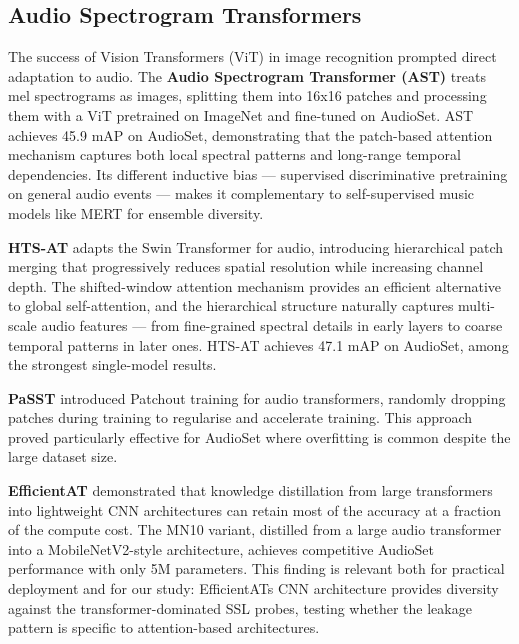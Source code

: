 \documentclass[conference]{IEEEtran}
\begin{document}
\subsection{Audio Spectrogram
Transformers}\label{e.-audio-spectrogram-transformers}

The success of Vision Transformers (ViT) \citep{dosovitskiy2021vit} in
image recognition prompted direct adaptation to audio. The \textbf{Audio
Spectrogram Transformer (AST)} \citep{gong2021ast} treats mel
spectrograms as images, splitting them into 16x16 patches and processing
them with a ViT pretrained on ImageNet and fine-tuned on AudioSet. AST
achieves 45.9 mAP on AudioSet, demonstrating that the patch-based
attention mechanism captures both local spectral patterns and long-range
temporal dependencies. Its different inductive bias --- supervised
discriminative pretraining on general audio events --- makes it
complementary to self-supervised music models like MERT for ensemble
diversity.

\textbf{HTS-AT} \citep{chen2022htsat} adapts the Swin Transformer
\citep{liu2021swin} for audio, introducing hierarchical patch merging
that progressively reduces spatial resolution while increasing channel
depth. The shifted-window attention mechanism provides an efficient
alternative to global self-attention, and the hierarchical structure
naturally captures multi-scale audio features --- from fine-grained
spectral details in early layers to coarse temporal patterns in later
ones. HTS-AT achieves 47.1 mAP on AudioSet, among the strongest
single-model results.

\textbf{PaSST} \citep{koutini2022passt} introduced Patchout training for
audio transformers, randomly dropping patches during training to
regularise and accelerate training. This approach proved particularly
effective for AudioSet where overfitting is common despite the large
dataset size.

\textbf{EfficientAT} \citep{schmid2023efficientat} demonstrated that
knowledge distillation from large transformers into lightweight CNN
architectures can retain most of the accuracy at a fraction of the
compute cost. The MN10 variant, distilled from a large audio transformer
into a MobileNetV2-style \citep{sandler2018mobilenetv2} architecture,
achieves competitive AudioSet performance with only 5M parameters. This
finding is relevant both for practical deployment and for our study:
EfficientAT\textquotesingle s CNN architecture provides diversity
against the transformer-dominated SSL probes, testing whether the
leakage pattern is specific to attention-based architectures.
\end{document}
